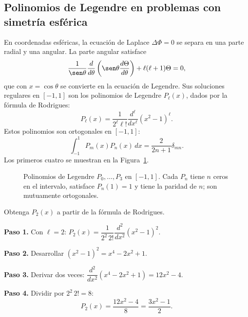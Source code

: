 \subsection{Polinomios de Legendre en problemas con simetría esférica}

En coordenadas esféricas, la ecuación de Laplace $\Delta \Phi=0$ se separa en una parte radial y una angular. La parte angular satisface
\[
  \frac{1}{\sen\theta}\frac{d}{d\theta}\left(\sen\theta \frac{d\Theta}{d\theta}\right)
  + \ell(\ell+1)\Theta = 0,
\]
que con $x=\cos\theta$ se convierte en la ecuación de Legendre. Sus soluciones regulares en $[-1,1]$ son los polinomios de Legendre $P_\ell(x)$, dados por la fórmula de Rodrigues:
\[
  \boxed{
    P_\ell(x)=\frac{1}{2^\ell \ell!}\frac{d^\ell}{dx^\ell}(x^2-1)^\ell
  }.
\]
Estos polinomios son ortogonales en $[-1,1]$:
\[
  \int_{-1}^{1} P_m(x) P_n(x)\,dx = \frac{2}{2n+1}\delta_{mn}.
\]
Los primeros cuatro se muestran en la Figura~\ref{fig:legendre}.

\begin{figure}[!htbp]
\centering
{}
\caption{Polinomios de Legendre $P_0,\dots,P_3$ en $[-1,1]$. Cada $P_n$ tiene $n$ ceros en el intervalo, satisface $P_n(1)=1$ y tiene la paridad de $n$; son mutuamente ortogonales.}
\label{fig:legendre}
\end{figure}

\begin{example}
  Obtenga $P_2(x)$ a partir de la fórmula de Rodrigues.
  \begin{myproof}
    \textbf{Paso 1.} Con $\ell=2$: $P_2(x)=\dfrac{1}{2^2\,2!}\dfrac{d^2}{dx^2}(x^2-1)^2$.

    \textbf{Paso 2.} Desarrollar $(x^2-1)^2=x^4-2x^2+1$.

    \textbf{Paso 3.} Derivar dos veces: $\dfrac{d^2}{dx^2}(x^4-2x^2+1)=12x^2-4$.

    \textbf{Paso 4.} Dividir por $2^2\,2!=8$:
    \[
      \boxed{P_2(x)=\frac{12x^2-4}{8}=\frac{3x^2-1}{2}.}
    \]
  \end{myproof}
\end{example}

